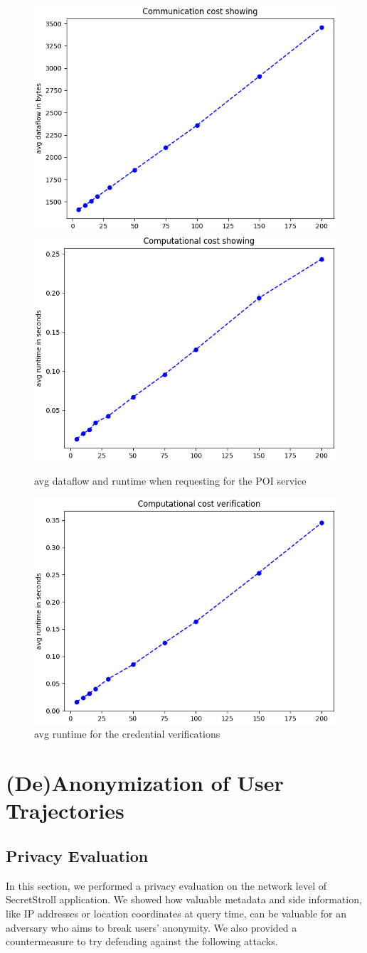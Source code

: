 \documentclass[10pt,conference,compsocconf]{IEEEtran}
\begin{document}
\begin{figure}[h!]
    \includegraphics[width=0.49\linewidth]{../performance_analysis/dataflow_showing.png}
    \includegraphics[width=0.49\linewidth]{../performance_analysis/runtime_showing.png}
    \caption{avg dataflow and runtime when requesting for the POI service}
    \label{fig:showing}
\end{figure}

\begin{figure}[h!]
    \includegraphics[width=0.49\linewidth]{../performance_analysis/runtime_verification}
    \caption{avg runtime for the credential verifications}
    \label{fig:verify}
\end{figure}


\section{(De)Anonymization of User Trajectories}

\subsection{Privacy Evaluation}
In this section, we performed a privacy evaluation on the network level of SecretStroll application. We showed how valuable metadata and side information, like IP addresses or location coordinates at query time, can be valuable for an adversary who aims to break users' anonymity. We also provided a countermeasure to try defending against the following attacks.
\end{document}
